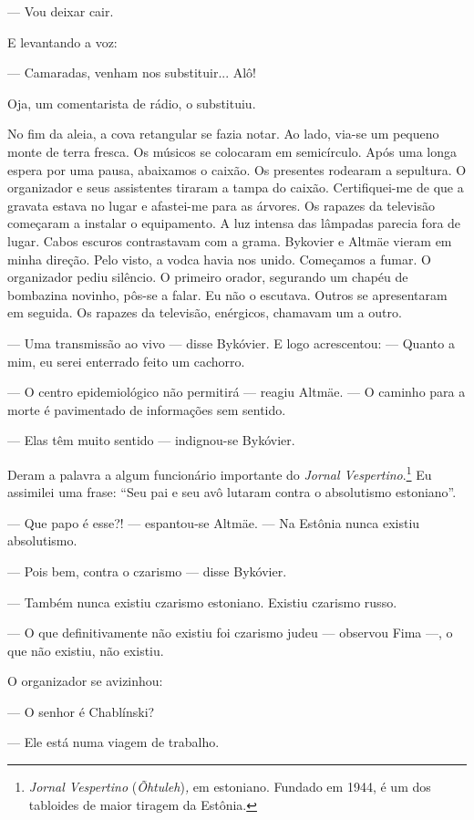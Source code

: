 --- Vou deixar cair.

E levantando a voz:

--- Camaradas, venham nos substituir... Alô!

Oja, um comentarista de rádio, o substituiu.

No fim da aleia, a cova retangular se fazia notar. Ao lado, via-se um
pequeno monte de terra fresca. Os músicos se colocaram em semicírculo.
Após uma longa espera por uma pausa, abaixamos o caixão. Os presentes
rodearam a sepultura. O organizador e seus assistentes tiraram a tampa
do caixão. Certifiquei-me de que a gravata estava no lugar e afastei-me
para as árvores. Os rapazes da televisão começaram a instalar o
equipamento. A luz intensa das lâmpadas parecia fora de lugar. Cabos
escuros contrastavam com a grama. Bykovier e Altmäe vieram em minha
direção. Pelo visto, a vodca havia nos unido. Começamos a fumar. O
organizador pediu silêncio. O primeiro orador, segurando um chapéu de
bombazina novinho, pôs-se a falar. Eu não o escutava. Outros se
apresentaram em seguida. Os rapazes da televisão, enérgicos, chamavam um
a outro.

--- Uma transmissão ao vivo --- disse Bykóvier. E logo acrescentou: ---
Quanto a mim, eu serei enterrado feito um cachorro.

--- O centro epidemiológico não permitirá --- reagiu Altmäe. --- O
caminho para a morte é pavimentado de informações sem sentido.

--- Elas têm muito sentido --- indignou-se Bykóvier.

Deram a palavra a algum funcionário importante do \emph{Jornal
Vespertino}.\footnote{\emph{Jornal Vespertino} (\emph{Õhtuleh})\emph{,}
  em estoniano. Fundado em 1944, é um dos tabloides de maior tiragem da
  Estônia.} Eu assimilei uma frase: ``Seu pai e seu avô lutaram contra o
absolutismo estoniano''.

--- Que papo é esse?! --- espantou-se Altmäe. --- Na Estônia nunca
existiu absolutismo.

--- Pois bem, contra o czarismo --- disse Bykóvier.

--- Também nunca existiu czarismo estoniano. Existiu czarismo russo.

--- O que definitivamente não existiu foi czarismo judeu --- observou
Fima ---, o que não existiu, não existiu.

O organizador se avizinhou:

--- O senhor é Chablínski?

--- Ele está numa viagem de trabalho.

